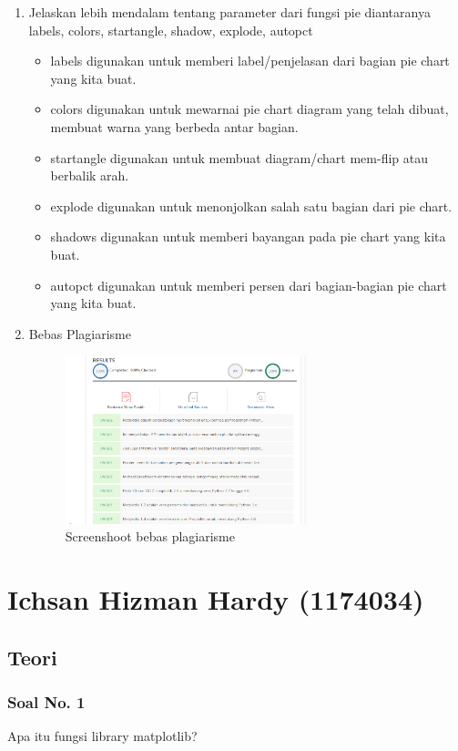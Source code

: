 \begin{enumerate}
\item Jelaskan lebih mendalam tentang parameter dari fungsi pie diantaranya labels,
colors, startangle, shadow, explode, autopct
\begin{itemize}
\item labels digunakan untuk memberi label/penjelasan dari bagian pie chart yang kita buat.
\item colors digunakan untuk mewarnai pie chart diagram yang telah dibuat, membuat warna yang berbeda antar bagian.
\item startangle digunakan untuk membuat diagram/chart mem-flip atau berbalik arah.
\item explode digunakan untuk menonjolkan salah satu bagian dari pie chart.
\item shadows digunakan untuk memberi bayangan pada pie chart yang kita buat.
\item autopct digunakan untuk memberi persen dari bagian-bagian pie chart yang kita buat.
\end{itemize}

\item Bebas Plagiarisme
\begin{figure}[H]
\centering
\includegraphics[width=7cm]{figures/6/1174050/Teori/plagiarism.png}
\caption{Screenshoot bebas plagiarisme}
\end{figure}

\end{enumerate}


\section{Ichsan Hizman Hardy (1174034)}
\subsection{Teori}
\subsubsection{Soal No. 1}
\hfill \break
Apa itu fungsi library matplotlib?

